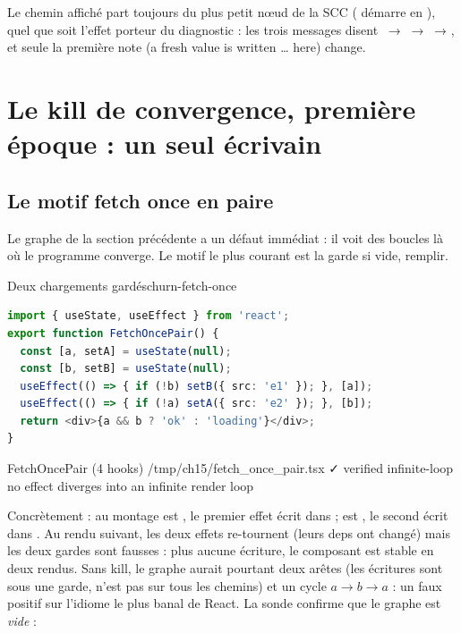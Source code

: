 Le chemin affiché part toujours du plus petit nœud de la SCC ( démarre
en ), quel que soit l'effet porteur du diagnostic : les trois
messages disent ~→ ~→ ~→ , et seule la première note (\og a fresh value
is written … here\fg) change.

\section{Le kill de convergence, première époque : un seul écrivain}
\label{sec:churn-kill-histoire}

\subsection{Le motif \og fetch once\fg{} en paire}

Le graphe de la section précédente a un défaut immédiat : il voit des boucles là où le
programme converge. Le motif le plus courant est la garde \og si vide, remplir\fg.

\begin{exemple}{Deux chargements gardés}{churn-fetch-once}
\begin{lstlisting}[language=TypeScript,caption={\file{/tmp/ch15/fetch_once_pair.tsx}},label={lst:churn-fetch-once}]
import { useState, useEffect } from 'react';
export function FetchOncePair() {
  const [a, setA] = useState(null);
  const [b, setB] = useState(null);
  useEffect(() => { if (!b) setB({ src: 'e1' }); }, [a]);
  useEffect(() => { if (!a) setA({ src: 'e2' }); }, [b]);
  return <div>{a && b ? 'ok' : 'loading'}</div>;
}
\end{lstlisting}
\begin{sortie}
  FetchOncePair  (4 hooks)  /tmp/ch15/fetch_once_pair.tsx  ✓
    verified  infinite-loop  no effect diverges into an infinite render loop
\end{sortie}
\end{exemple}

Concrètement : au montage  est , le premier effet écrit 
dans  ;  est , le second écrit  dans . Au
rendu suivant, les deux effets re-tournent (leurs deps ont changé) mais les deux gardes sont
fausses : plus aucune écriture, le composant est stable en deux rendus. Sans kill, le graphe
aurait pourtant deux arêtes  (les écritures sont sous une garde,
 n'est pas sur tous les chemins) et un cycle $a \to b \to a$ : un
\Warning{} faux positif sur l'idiome le plus banal de React. La sonde confirme que le graphe
est \emph{vide} :

